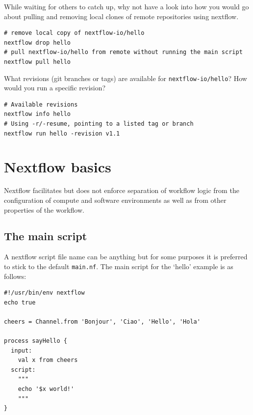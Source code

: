 \begin{bonus}
While waiting for others to catch up, why not have a look into how you would go about pulling and removing  
local clones of remote repositories using nextflow.
\begin{answer}
\begin{lstlisting}
# remove local copy of nextflow-io/hello
nextflow drop hello
# pull nextflow-io/hello from remote without running the main script
nextflow pull hello
\end{lstlisting}
\end{answer}
\end{bonus}

\begin{bonus}
What revisions (git branches or tags) are available for \texttt{nextflow-io/hello}?
How would you run a specific revision? 
\begin{answer}
\begin{lstlisting}
# Available revisions 
nextflow info hello
# Using -r/-resume, pointing to a listed tag or branch
nextflow run hello -revision v1.1
\end{lstlisting}
\end{answer}
\end{bonus}

\section{Nextflow basics}

Nextflow facilitates but does not enforce separation of workflow logic from the configuration
of compute and software environments as well as from other properties of the workflow.


\subsection{The main script}

A nextflow script file name can be anything but for some purposes it is preferred to stick to the default \texttt{main.nf}. The main script for the `hello' example is as follows:


\begin{lstlisting}
#!/usr/bin/env nextflow
echo true 

cheers = Channel.from 'Bonjour', 'Ciao', 'Hello', 'Hola'

process sayHello {
  input: 
    val x from cheers
  script:
    """
    echo '$x world!'
    """
}
\end{lstlisting}

